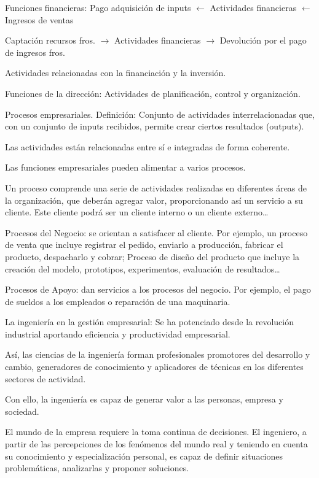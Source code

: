 \documentclass[12pt, twoside, openright]{report} %
\begin{document}
Funciones financieras: Pago adquisición de inputs $\leftarrow$ Actividades financieras $\leftarrow$ Ingresos de ventas

Captación recursos fros. $\rightarrow$ Actividades financieras $\rightarrow$ Devolución por el pago de ingresos fros.

Actividades relacionadas con la financiación y la inversión.

Funciones de la dirección: Actividades de planificación, control y organización.

Procesos empresariales. Definición: Conjunto de actividades interrelacionadas que, con un conjunto de inputs recibidos, permite crear ciertos resultados (outputs).

Las actividades están relacionadas entre sí e integradas de forma coherente.

Las funciones empresariales pueden alimentar a varios procesos.

Un proceso comprende una serie de actividades realizadas en diferentes áreas de la organización, que deberán agregar valor, proporcionando así un servicio a su cliente. Este cliente podrá ser un cliente interno o un cliente externo…
\pagebreak

Procesos del Negocio: se orientan a satisfacer al cliente. Por ejemplo, un proceso de venta que incluye registrar el pedido, enviarlo a producción, fabricar el producto, despacharlo y cobrar; Proceso de diseño del producto que incluye la creación del modelo, prototipos, experimentos, evaluación de resultados…

Procesos de Apoyo: dan servicios a los procesos del negocio. Por ejemplo, el pago de sueldos a los empleados o reparación de una maquinaria.

La ingeniería en la gestión empresarial: Se ha potenciado desde la revolución industrial aportando eficiencia y productividad empresarial.

Así, las ciencias de la ingeniería forman profesionales promotores del desarrollo y cambio, generadores de conocimiento y aplicadores de técnicas en los diferentes sectores de actividad.

Con ello, la ingeniería es capaz de generar valor a las personas, empresa y sociedad.

El mundo de la empresa requiere la toma continua de decisiones. El ingeniero, a partir de las percepciones de los fenómenos del mundo real y teniendo en cuenta su conocimiento y especialización personal, es capaz de definir situaciones problemáticas, analizarlas y proponer soluciones.
\end{document}

